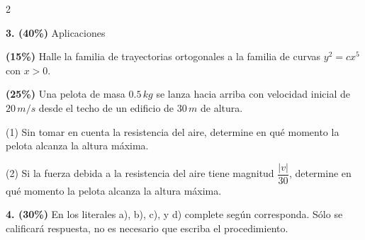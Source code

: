 \documentclass[11pt]{article}
\begin{document}
\begin{multicols}{2}

\textbf{3. (40\%)} Aplicaciones

\begin{opciones}
\item[(a)] \textbf{(15\%)} Halle la familia de trayectorias ortogonales a la familia de curvas $y^2=cx^5$ con $x>0$.
\end{opciones}

\vspace{5cm}

\columnbreak

\begin{opciones}
\item[(b)] \textbf{(25\%)} Una pelota de masa $0.5\,kg$ se lanza hacia arriba con velocidad inicial de $20\,m/s$ desde el techo de un edificio de $30\,m$ de altura.

(1) Sin tomar en cuenta la resistencia del aire, determine en qué momento la pelota alcanza la altura máxima.

(2) Si la fuerza debida a la resistencia del aire tiene magnitud $\dfrac{|v|}{30}$, determine en qué momento la pelota alcanza la altura máxima.
\end{opciones}
\begin{center}
\end{center}

\end{multicols}

\noindent\textbf{4. (30\%)} En los literales a), b), c), y d) complete según corresponda. Sólo se calificará respuesta, no es necesario que escriba el procedimiento.
\end{document}
